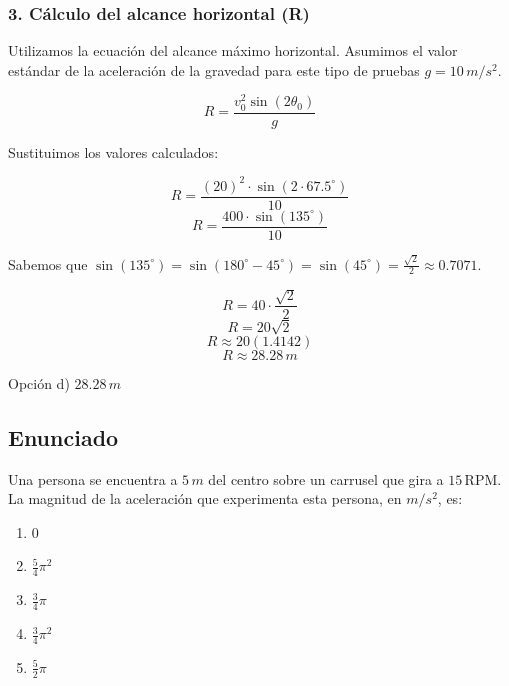 \documentclass[12pt, a4paper]{article}
\begin{document}
\subsubsection*{3. Cálculo del alcance horizontal (R)}
Utilizamos la ecuación del alcance máximo horizontal. Asumimos el valor estándar de la aceleración de la gravedad para este tipo de pruebas $g = 10 \, \si{m/s^2}$.

$$R = \frac{v_0^2 \sin(2\theta_0)}{g}$$

Sustituimos los valores calculados:

$$R = \frac{(20)^2 \cdot \sin(2 \cdot 67.5^\circ)}{10}$$
$$R = \frac{400 \cdot \sin(135^\circ)}{10}$$

Sabemos que $\sin(135^\circ) = \sin(180^\circ - 45^\circ) = \sin(45^\circ) = \frac{\sqrt{2}}{2} \approx 0.7071$.

$$R = 40 \cdot \frac{\sqrt{2}}{2}$$
$$R = 20\sqrt{2}$$
$$R \approx 20(1.4142)$$
$$R \approx 28.28 \, \si{m}$$

\begin{tcolorbox}[colback=green!5!white, colframe=green!50!black, title=Respuesta Final]
\centering Opción d) $28.28 \, \si{m}$
\end{tcolorbox}

\newpage

\subsection*{Enunciado}
Una persona se encuentra a $5 \, \si{m}$ del centro sobre un carrusel que gira a $15 \, \text{RPM}$. La magnitud de la aceleración que experimenta esta persona, en $\si{m/s^2}$, es:
\begin{enumerate}[label=\alph*)]
    \item $0$
    \item $\frac{5}{4}\pi^2$
    \item $\frac{3}{4}\pi$
    \item $\frac{3}{4}\pi^2$
    \item $\frac{5}{2}\pi$
\end{enumerate}

\begin{center}
\end{center}
\end{document}
